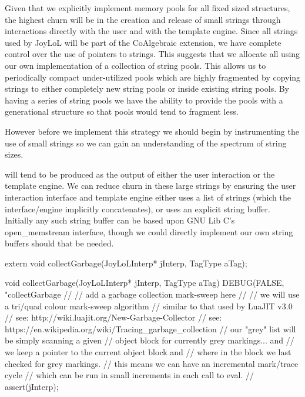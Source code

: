 Given that we explicitly implement memory pools for all fixed sized 
structures, the highest churn will be in the creation and release of small 
strings through interactions directly with the user and with the template 
engine. Since all strings used by JoyLoL will be part of the 
 CoAlgebraic extension, we have complete control over the 
use of pointers to strings. This suggests that we allocate all 
 using our own implementation of a collection of 
string pools. This allows us to periodically compact under-utilized pools 
which are highly fragmented by copying strings to either completely new 
string pools or inside existing string pools. By having a series of string 
pools we have the ability to provide the pools with a generational 
structure so that  pools would tend to fragment less. 

However before we implement this strategy we should begin by instrumenting 
the use of small strings so we can gain an understanding of the spectrum of 
string sizes. 

 will tend to be produced as the output of either the 
user interaction or the template engine. We can reduce churn in these 
large strings by ensuring the user interaction interface and template 
engine either uses a list of strings (which the interface/engine 
implicitly concatenates), or uses an explicit string buffer. Initially any 
such string buffer can be based upon GNU Lib C's open_memstream interface, 
though we could directly implement our own string buffers should that be 
needed. 

\startCHeader
extern void collectGarbage(JoyLoLInterp* jInterp, TagType aTag);
\stopCHeader
{}

\startCCode
void collectGarbage(JoyLoLInterp* jInterp, TagType aTag) {
  DEBUG(FALSE, "collectGarbage %
  //
  // add a garbage collection mark-sweep here
  //
  // we will use a tri/quad colour mark-sweep algorithm
  // similar to that used by LuaJIT v3.0
  // see: http://wiki.luajit.org/New-Garbage-Collector
  // see: https://en.wikipedia.org/wiki/Tracing_garbage_collection
  // our "grey" list will be simply scanning a given 
  // object block for currently grey markings... and
  // we keep a pointer to the current object block and
  // where in the block we last checked for grey markings.
  // this means we can have an incremental mark/trace cycle
  // which can be run in small increments in each call to eval.
  //
  assert(jInterp);
}
\stopCCode

